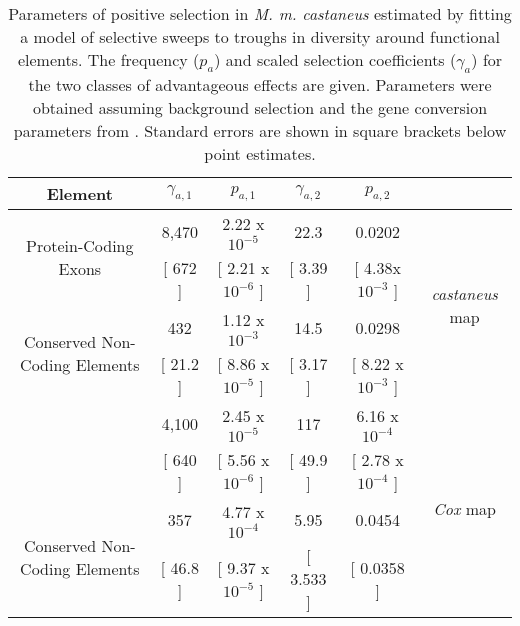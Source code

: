 

\begin{sidewaystable}[H]
\caption{Parameters of positive selection in \textit{M. m. castaneus} estimated by fitting a model of selective sweeps to troughs in diversity around functional elements. The frequency ($p_a$) and scaled selection coefficients ($\gamma_a$) for the two classes of advantageous effects are given. Parameters were obtained assuming background selection and the gene conversion parameters from \cite{RN263}. Standard errors are shown in square brackets below point estimates.}
\centering
	\label{tab:EstimatesCastaneus}
        \begin{tabular}{cccccc}

        \hline
  Element  &  $\gamma_{a,1}$ & $p_{a,1}$ &$\gamma_{a,2}$ & $p_{a,2}$ &  \\ [0.5ex] \hline

\multirow{2}{*}{Protein-Coding Exons} &  8,470 & 2.22 x $10^{-5}$ & 22.3 & 0.0202 & \multirow{4}{*}{\textit{castaneus} map}\\
   &  [ 672 ] & [ 2.21 x $10^{-6}$ ]& [ 3.39 ] & [ 4.38x $10^{-3}$ ] & \\ 
\multirow{2}{*}{Conserved Non-Coding Elements}  & 432 & 1.12 x $10^{-3}$ & 14.5 & 0.0298 & \\
  &   [ 21.2 ] & [ 8.86 x $10^{-5}$ ]& [ 3.17 ] & [ 8.22 x $10^{-3}$ ] &\\ \hdashline
\multirow{2}{*}{Protein-Coding Exons} &  4,100 & 2.45 x $10^{-5}$ & 117 & 6.16 x $10^{-4}$  & \multirow{4}{*}{\textit{Cox} map}\\
   &  [ 640 ] & [ 5.56 x $10^{-6}$ ]& [ 49.9 ] & [ 2.78 x $10^{-4}$ ] & \\ 
   
\multirow{2}{*}{Conserved Non-Coding Elements}  & 357  &  4.77 x $10^{-4}$ & 5.95 & 0.0454 & \\
  &   [ 46.8 ] & [ 9.37 x $10^{-5}$ ]& [ 3.533 ] & [  0.0358 ] &\\ \hline
        \end{tabular}
   
\end{sidewaystable}

